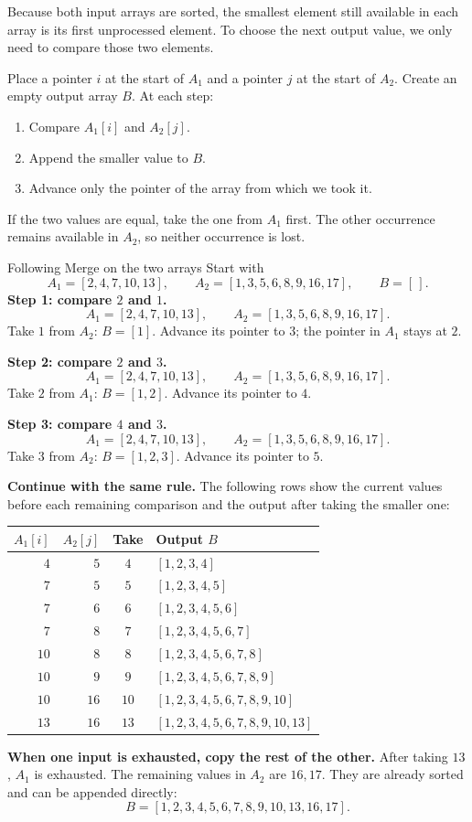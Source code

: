 \documentclass[a4paper,12pt,oneside]{report}
\begin{document}
Because both input arrays are sorted, the smallest element still
available in each array is its first unprocessed element. To choose
the next output value, we only need to compare those two elements.

Place a pointer $i$ at the start of $A_1$ and a pointer $j$ at the
start of $A_2$. Create an empty output array $B$. At each step:
\begin{enumerate}
  \item Compare $A_1[i]$ and $A_2[j]$.
  \item Append the smaller value to $B$.
  \item Advance only the pointer of the array from which we took it.
\end{enumerate}
If the two values are equal, take the one from $A_1$ first. The other
occurrence remains available in $A_2$, so neither occurrence is lost.

\begin{framedexample}{Following Merge on the two arrays}\label{ex:merge-steps}
Start with
\[
  A_1=[2,4,7,10,13],\qquad A_2=[1,3,5,6,8,9,16,17],\qquad B=[\,].
\]
\textbf{Step 1: compare $2$ and $1$.}
\[
  A_1=[\boxed{2},4,7,10,13],\qquad
  A_2=[\boxed{1},3,5,6,8,9,16,17].
\]
Take $1$ from $A_2$: $B=[1]$. Advance its pointer to $3$; the
pointer in $A_1$ stays at $2$.

\textbf{Step 2: compare $2$ and $3$.}
\[
  A_1=[\boxed{2},4,7,10,13],\qquad
  A_2=[1,\boxed{3},5,6,8,9,16,17].
\]
Take $2$ from $A_1$: $B=[1,2]$. Advance its pointer to $4$.

\textbf{Step 3: compare $4$ and $3$.}
\[
  A_1=[2,\boxed{4},7,10,13],\qquad
  A_2=[1,\boxed{3},5,6,8,9,16,17].
\]
Take $3$ from $A_2$: $B=[1,2,3]$. Advance its pointer to $5$.

\textbf{Continue with the same rule.}
The following rows show the current values before each remaining
comparison and the output after taking the smaller one:
\begin{center}
\small
\begin{tabular}{rr|c|l}
  $A_1[i]$ & $A_2[j]$ & Take & Output $B$\\\hline
  $4$ & $5$ & $4$ & $[1,2,3,4]$\\
  $7$ & $5$ & $5$ & $[1,2,3,4,5]$\\
  $7$ & $6$ & $6$ & $[1,2,3,4,5,6]$\\
  $7$ & $8$ & $7$ & $[1,2,3,4,5,6,7]$\\
  $10$ & $8$ & $8$ & $[1,2,3,4,5,6,7,8]$\\
  $10$ & $9$ & $9$ & $[1,2,3,4,5,6,7,8,9]$\\
  $10$ & $16$ & $10$ & $[1,2,3,4,5,6,7,8,9,10]$\\
  $13$ & $16$ & $13$ & $[1,2,3,4,5,6,7,8,9,10,13]$
\end{tabular}
\end{center}
\textbf{When one input is exhausted, copy the rest of the other.}
After taking $13$, $A_1$ is exhausted. The remaining values in $A_2$
are $16,17$. They are already sorted and can be appended directly:
\[
  B=[1,2,3,4,5,6,7,8,9,10,13,16,17].
\]
\end{framedexample}
\end{document}

